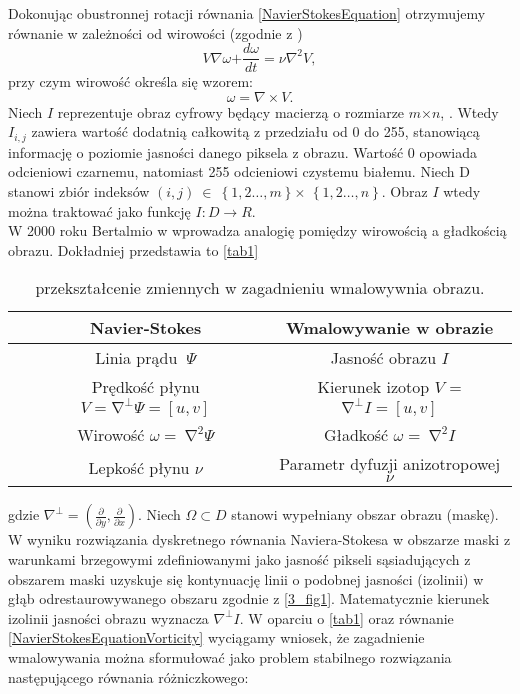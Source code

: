 \documentclass[a4paper,12pt,twoside,openany]{report}
\begin{document}
Dokonując obustronnej rotacji równania \eqref{NavierStokesEquation} otrzymujemy równanie w zależności od wirowości (zgodnie z \cite{StreamfuntionVorticityForm})
\begin{equation}
V\nabla \omega \mathrm{+}\frac{d\omega }{dt}\mathrm{=}\nu {\nabla }^{\mathrm{2}}V
\label{NavierStokesEquationVorticity}
,
\end{equation}
przy czym wirowość określa się wzorem:
\begin{equation}
\omega =\nabla \times V
\label{Vorticity}
.
\end{equation}
Niech $I$ reprezentuje obraz cyfrowy będący macierzą o rozmiarze $m \mathrm{\times} n$, \cite{ebrahimi2012navier}. Wtedy $I_{i,j}$ zawiera wartość dodatnią całkowitą z przedziału od 0 do 255, stanowiącą informację o poziomie jasności danego piksela z obrazu. Wartość 0 opowiada odcieniowi czarnemu, natomiast 255 odcieniowi czystemu białemu. Niech D stanowi zbiór indeksów $(i,j)\ \in \ \left\{1,2\dots ,m\right\} \mathrm{\times}$ $\left\{1,2\dots ,n\right\}$. Obraz $I$ wtedy można traktować jako funkcję $I:D\to R$. \\
W 2000 roku Bertalmio w \cite{BertalmioNavierStokes} wprowadza analogię pomiędzy wirowością a gładkością obrazu. Dokładniej przedstawia to \autoref{tab1}
\begin{table}[!h]
	\centering
	\begin{tabular}{|cc|c|}
	\hline \hline

		& Navier-Stokes
		& Wmalowywanie w obrazie\\ \hline
		
		& Linia prądu $\ \mathit{\Psi}$ &  Jasność obrazu $I$ \\ \hline
	
		& Prędkość płynu $V = {\mathrm{\nabla }}^{\bot }\mathit{\Psi} = [u, v]$  & Kierunek izotop $V$ = ${\mathrm{\nabla }}^{\bot }I = [u, v]$ \\ \hline
		& Wirowość $\omega =\ {\mathrm{\nabla }}^2\mathit{\Psi}$ & Gładkość $\omega =\ {\mathrm{\nabla }}^2I$ \\ \hline
		
		& Lepkość płynu $\nu $ & Parametr dyfuzji anizotropowej $\nu $ \\
	\hline
	\end{tabular}
	\caption{przekształcenie zmiennych w zagadnieniu wmalowywnia obrazu.}
	\label{tab1}
\end{table}
gdzie ${\nabla }^{\bot }=\left(\frac{\partial }{\partial y},\frac{\partial }{\partial x}\right)$.
Niech $\mathit{\Omega}\subset D$ stanowi wypełniany obszar obrazu (maskę). W wyniku rozwiązania dyskretnego równania Naviera-Stokesa w obszarze maski z warunkami brzegowymi zdefiniowanymi jako jasność pikseli sąsiadujących z obszarem maski uzyskuje się kontynuację linii o podobnej jasności (izolinii) w głąb odrestaurowywanego obszaru zgodnie z \autoref{3_fig1}.  Matematycznie kierunek izolinii jasności obrazu wyznacza ${\nabla }^{\bot }I$. W oparciu o \autoref{tab1} oraz równanie  \eqref{NavierStokesEquationVorticity} wyciągamy wniosek, że zagadnienie wmalowywania można sformułować jako problem stabilnego rozwiązania następującego równania różniczkowego:
\end{document}
